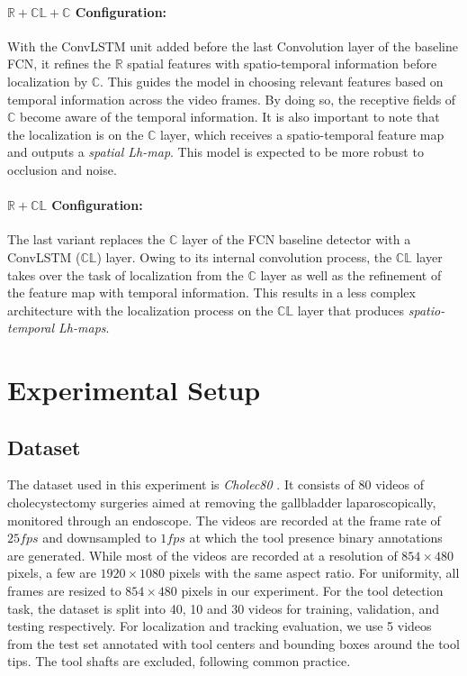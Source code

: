\documentclass{svjour3}                     \smartqed
\newcommand{\bd}[1]{\textbf{#1}}
\begin{document}
\paragraph{$\mathbb{R+CL+C}$ \bd{Configuration}:} With the ConvLSTM unit added before the last Convolution layer of the baseline FCN, it refines the $\mathbb{R}$ spatial features with spatio-temporal information before localization by $\mathbb{C}$. This guides the model in choosing relevant features based on temporal information across the video frames. By doing so, the receptive fields of  $\mathbb{C}$ become aware of the temporal information. 
It is also important to note that the localization is on the $\mathbb{C}$ layer, which receives a spatio-temporal feature map and outputs a \textit{spatial Lh-map}. 
This model is expected to be more robust to occlusion and noise. 

\paragraph{$\mathbb{R+CL}$ \bd{Configuration}:} The last variant replaces the $\mathbb{C}$ layer of the FCN baseline detector with a ConvLSTM ($\mathbb{CL}$) layer. 
Owing to its internal convolution process, the $\mathbb{CL}$ layer takes over the task of localization from the $\mathbb{C}$ layer as well as the refinement of the feature map with temporal information. This results in a less complex architecture with the localization process on the $\mathbb{CL}$ layer that produces \textit{spatio-temporal Lh-maps}.




\section{Experimental Setup}
\label{sec:experiments}
\subsection{Dataset}\label{sec:dataset_analysis}
The dataset used in this experiment is \textit{Cholec80} \cite{tmi:twinanda2017endonet}. It consists of 80 videos of cholecystectomy surgeries aimed at removing the gallbladder laparoscopically, monitored through an endoscope.
The videos are recorded at the frame rate of $25fps$ and downsampled to $1fps$ at which the tool presence binary annotations are generated. While most of the videos are recorded at a resolution of $854\times480$ pixels, a few are $1920\times1080$ pixels with the same aspect ratio. For uniformity, all frames are resized to $854\times480$ pixels in our experiment. 
For the tool detection task, the dataset is split into 40, 10 and 30 videos for training, validation, and testing respectively. 
For localization and tracking evaluation, we use 5 videos from the test set annotated with tool centers and bounding boxes around the tool tips. The tool shafts are excluded, following common practice.
\end{document}
